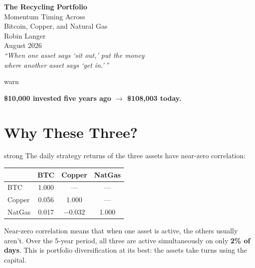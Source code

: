 \documentclass[11pt,a4paper]{article}
\begin{document}

\begin{center}
\vspace*{2cm}
{\Huge\bfseries\color{accent} The Recycling Portfolio}\\[1em]
{\LARGE Momentum Timing Across\\[0.3em]
Bitcoin, Copper, and Natural Gas}\\[2em]
{\large Robin Langer}\\[0.5em]
{\small August 2026}\\[3em]
\textit{``When one asset says `sit out,' put the money\\
where another asset says `get in.'\,''}
\vspace*{1.5cm}
\end{center}

\thispagestyle{empty}




\begin{resultbox}[]{warn}
\begin{center}
\Large\bfseries \$10,000 invested five years ago $\longrightarrow$ \$108,003 today.
\end{center}
\end{resultbox}


\section*{Why These Three?}

\begin{resultbox}[Diversification]{strong}
The daily strategy returns of the three assets have near-zero
correlation:

\vspace{0.3em}
\begin{tabular}{@{}lccc@{}}
    \toprule
    & \textbf{BTC} & \textbf{Copper} & \textbf{NatGas} \\
    \midrule
    BTC     & 1.000 & --- & --- \\
    Copper  & 0.056 & 1.000 & --- \\
    NatGas  & 0.017 & $-0.032$ & 1.000 \\
    \bottomrule
\end{tabular}

\vspace{0.5em}
Near-zero correlation means that when one asset is active, the
others usually aren't. Over the 5-year period, all three are active
simultaneously on only \textbf{2\% of days}. This is portfolio
diversification at its best: the assets take turns using the capital.
\end{resultbox}
\end{document}

